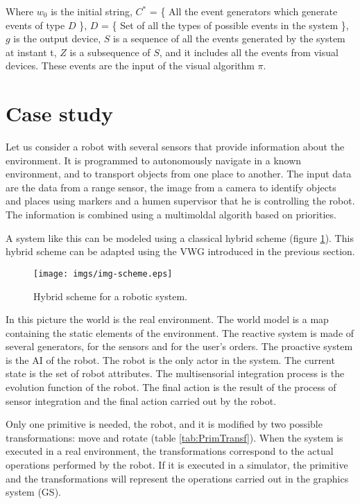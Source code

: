 \documentclass{svmult}
\begin{document}
Where $w_0$ is the initial string, 
$C^*$ = \{ All the event generators which generate events of type $D$ \}, 
$D$ = \{ Set of all the types of possible events in the system \}, 
$g$ is the output device, 
$S$ is a sequence of all the events generated by the system at instant t, 
$Z$ is a subsequence of $S$, 
and it includes all the events from visual devices. These events are
the input of the visual algorithm $\pi$.





\section{Case study}

Let us consider a robot with several sensors that provide information about the environment. 
It is programmed to autonomously navigate in a known environment, and to transport objects from one place to another. The input data are the data from a range sensor, the image from a camera to identify objects and places using markers and a humen supervisor that he is controlling the robot. The information is combined using a multimoldal algorith based on priorities.

A system like this can be modeled using a classical hybrid scheme (figure \ref{fig:hybrid}). This hybrid scheme can be adapted using the VWG introduced in the previous section.

%
\begin{figure}
	\centering
	\texttt{[image: imgs/img-scheme.eps]}
	\caption{\label{fig:hybrid} Hybrid scheme for a robotic system.}
\end{figure}

In this picture the world is the real environment. The world model is a map containing the static elements of the environment. The reactive system is made of several generators, for the sensors and for the user's orders. The proactive system is the AI of the robot. The robot is the only actor in the system. The current state is the set of robot attributes. The multisensorial integration process is the evolution function of the robot. The final action is the result of the process of sensor integration and the final action carried out by the robot.


Only one primitive is needed, the robot, and it is modified by two possible transformations: move and rotate (table \ref{tab:PrimTransf}). When the system is executed in a real environment, the transformations correspond to the actual operations performed by the robot. If it is executed in a simulator, the primitive and the transformations will represent the operations carried out in the graphics system (GS).
\end{document}
